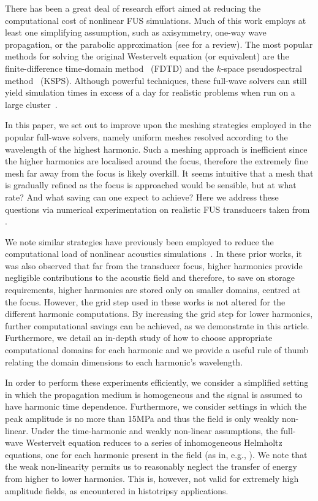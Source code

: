 \documentclass[preprint]{JASA}
\newcommand{\red}[1]{{\color{red} #1}}
\begin{document}
There has been a great deal of research effort aimed at reducing the computational
cost of nonlinear \red{FUS} simulations. Much of this work employs at least one simplifying assumption, 
such as axisymmetry, one-way wave propagation, or the parabolic approximation
(see \cite{gu2015modeling} for a review). The most popular methods for solving 
the original Westervelt equation (or equivalent) are the finite-difference 
time-domain method~\cite{solovchuk2013simulation} (FDTD) and the $k$-space 
pseudospectral method~\cite{treeby2012modeling} (KSPS). Although powerful 
techniques, these full-wave solvers can still yield simulation times in excess 
of a day for realistic problems when run on a large cluster~\cite{jaros2016full}.

In this paper, we set out to improve upon the meshing strategies employed in 
the popular full-wave solvers, namely uniform meshes resolved according 
to the wavelength of the highest harmonic. Such a meshing approach is 
inefficient since the higher harmonics are localised around the focus, 
therefore the extremely fine mesh far away from the focus 
is likely overkill. It seems intuitive that a mesh that is gradually refined 
as the focus is approached would be sensible, but at what rate? And what saving 
can one expect to achieve? Here we address these questions via numerical 
experimentation on realistic \red{FUS} transducers taken from \cite{sonic}.

\red{We note similar strategies have previously been employed to reduce the 
computational load of nonlinear acoustics simulations~\cite{yuldashev2011simulation,karzova2017shock}.
In these prior works, it was also observed that far from the transducer focus, higher harmonics provide 
negligible contributions to the acoustic field and therefore, to save on storage requirements, 
higher harmonics are stored only on smaller domains, centred at the focus. However, the grid
step used in these works is not altered for the different harmonic computations. 
By increasing the grid step for lower harmonics, further computational savings can be 
achieved, as we demonstrate in this article. Furthermore, we detail an in-depth 
study of how to choose appropriate computational domains for each harmonic and 
 we provide a useful rule of thumb relating the domain dimensions to each harmonic's wavelength.}


In order to perform these experiments efficiently, we consider a simplified setting 
in which the propagation medium is homogeneous and the signal is assumed to have 
harmonic time dependence. \red{Furthermore, we consider settings in which the peak amplitude 
is no more than 15MPa and thus the field is only weakly non-linear}. Under the time-harmonic 
\red{and weakly non-linear assumptions}, the full-wave Westervelt 
equation reduces to a series of inhomogeneous 
Helmholtz equations, one for each harmonic present in the field (as in, e.g., 
\cite{du2013fast}). %
\red{We note that the weak non-linearity permits us to reasonably neglect the 
transfer of energy from higher to lower harmonics. This is, however, not valid for 
extremely high amplitude fields, as encountered in histotripsy applications.}
\end{document}
